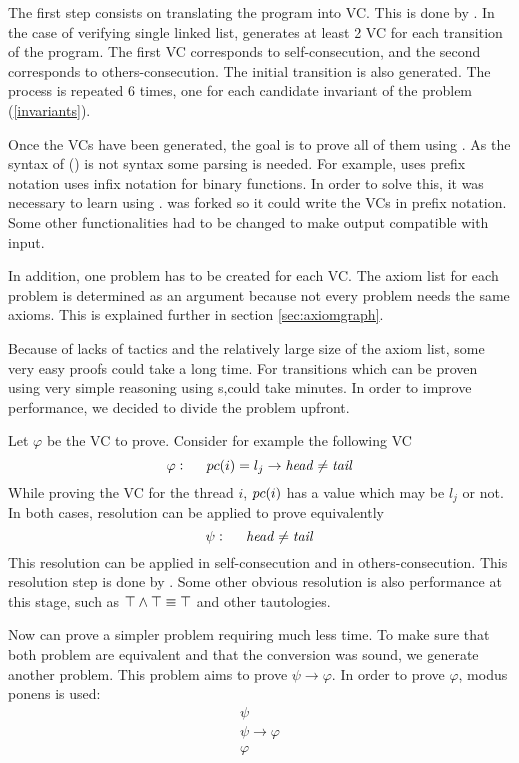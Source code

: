The first step consists on translating the program into \gls{VC}. 
%
This is done by \leap. 
%
In the case of verifying single linked list, \leap generates at least 2 \gls{VC} for each transition of the program. 
%
The first \gls{VC} corresponds to self-consecution, and the second corresponds to others-consecution.
%
The initial transition is also generated.
%
The process is repeated 6 times, one for each candidate invariant of the problem (\ref{invariants}).

Once the \gls{VC}s have been generated, the goal is to prove all of them using \spass. 
%
As the syntax of \spass (\cite{spasssyntax}) is not \leap syntax some parsing is needed. 
%
For example, \spass uses prefix notation  \leap uses infix notation for binary functions.
%
In order to solve this, it was necessary to learn \ocaml using \cite{ocamlbook}.
%
\leap was forked so it could write the \gls{VC}s in prefix notation.
%
Some other \leap functionalities had to be changed to make \leap output compatible with \spass input.

In addition, one \spass problem has to be created for each \gls{VC}. 
%
The axiom list for each problem is determined as an argument because not every \spass problem needs the same axioms. 
%
This is explained further in section \ref{sec:axiomgraph}.

Because of \spass lacks of tactics and the relatively large size of the axiom list, some very easy proofs could take a long time.
%
For transitions which can be proven using very simple reasoning using \pc s,\spass could take minutes. 
%
In order to improve \spass performance, we decided to divide the problem upfront.

Let $\varphi$ be the \gls{VC} to prove. Consider for example the following \gls{VC}
	\[
		\varphi : \;\;\;\;\; pc(i) = l_j \to \mathit{head} \not = \mathit{tail}
	\]
While proving the \gls{VC} for the thread $i$, $pc(i)$ has a value which may be $l_j$ or not. 
%
In both cases, resolution can be applied to prove equivalently
	\[
		\psi : \;\;\;\;\; \mathit{head} \not = \mathit{tail}
	\]
This resolution can be applied in self-consecution and in others-consecution. 
%
This resolution step is done by \gandalf. 
%
Some other obvious resolution is also performance at this stage, such as $\top \wedge \top \equiv \top$ and other tautologies.

Now \spass can prove a simpler problem requiring much less time.
%
To make sure that both problem are equivalent and that the conversion was sound, we generate another \spass problem. 
%
This \spass problem aims to prove $\psi \to \varphi$.
%
In order to prove $\varphi$, modus ponens is used:
\[
	\begin{array}{l}
		\psi\\
		\psi \to \varphi\\\hline
		\varphi
	\end{array}
\]

